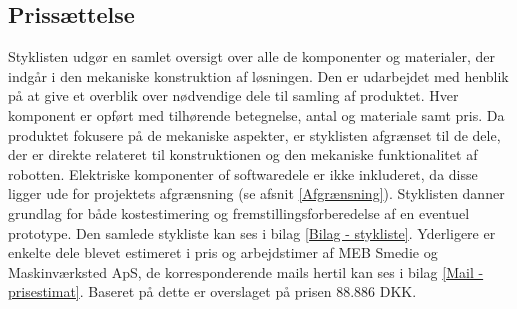 \subsection{Prissættelse} \label{Stykliste}
Styklisten udgør en samlet oversigt over alle de komponenter og materialer, der indgår i den mekaniske konstruktion af løsningen. Den er udarbejdet med henblik på at give et overblik over nødvendige dele til samling af produktet. Hver komponent er opført med tilhørende betegnelse, antal og  materiale samt pris. Da produktet fokusere på de mekaniske aspekter, er styklisten afgrænset til de dele, der er direkte relateret til konstruktionen og den mekaniske funktionalitet af robotten. Elektriske komponenter of softwaredele er ikke inkluderet, da disse ligger ude for projektets afgrænsning (se afsnit \ref{Afgrænsning}). Styklisten danner grundlag for både kostestimering og fremstillingsforberedelse af en eventuel prototype. Den samlede stykliste kan ses i bilag \ref{Bilag - stykliste}. Yderligere er enkelte dele blevet estimeret i pris og arbejdstimer af MEB Smedie og Maskinværksted ApS, de korresponderende mails hertil kan ses i bilag \ref{Mail - prisestimat}. Baseret på dette er overslaget på prisen 88.886 DKK.




